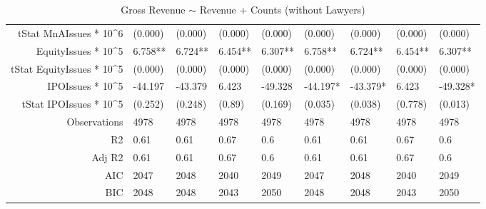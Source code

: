 \begin{table}[ht]
\begin{tabular}{rllllllll}
  tStat MnAIssues * 10^6 & (0.000) & (0.000) & (0.000) & (0.000) & (0.000) & (0.000) & (0.000) & (0.000) \\ 
  EquityIssues * 10^5 & 6.758** & 6.724** & 6.454** & 6.307** & 6.758** & 6.724** & 6.454** & 6.307** \\ 
  tStat EquityIssues * 10^5 & (0.000) & (0.000) & (0.000) & (0.000) & (0.000) & (0.000) & (0.000) & (0.000) \\ 
  IPOIssues * 10^5 & -44.197 & -43.379 & 6.423 & -49.328 & -44.197* & -43.379* & 6.423 & -49.328* \\ 
  tStat IPOIssues * 10^5 & (0.252) & (0.248) & (0.89) & (0.169) & (0.035) & (0.038) & (0.778) & (0.013) \\ 
  Observations & 4978 & 4978 & 4978 & 4978 & 4978 & 4978 & 4978 & 4978 \\ 
  R2 & 0.61 & 0.61 & 0.67 & 0.6 & 0.61 & 0.61 & 0.67 & 0.6 \\ 
  Adj R2 & 0.61 & 0.61 & 0.67 & 0.6 & 0.61 & 0.61 & 0.67 & 0.6 \\ 
  AIC & 2047 & 2048 & 2040 & 2049 & 2047 & 2048 & 2040 & 2049 \\ 
  BIC & 2048 & 2048 & 2043 & 2050 & 2048 & 2048 & 2043 & 2050 \\ 
   \hline
\end{tabular}
\caption{Gross Revenue $\sim$ Revenue + Counts (without Lawyers)} 
\end{table}
